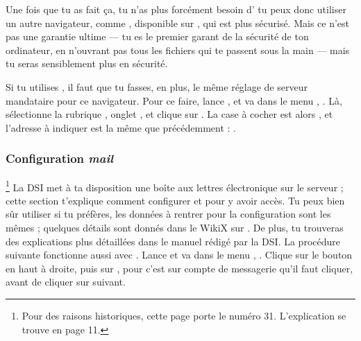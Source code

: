 Une fois que tu as fait \c{c}a, tu n'as plus forcément besoin d' tu peux donc utiliser un autre navigateur, comme , disponible sur \xshare, qui est plus sécurisé. Mais ce n'est pas une garantie ultime --- tu es le premier garant de la sécurité de ton
ordinateur, en n'ouvrant pas tous les fichiers qui te passent sous la main
--- mais tu seras sensiblement plus en sécurité.



Si tu utilises , il faut que tu fasses, en plus, le même réglage de serveur mandataire pour
ce navigateur. Pour ce faire, lance , et va dans le menu ,
. Là, sélectionne la rubrique , onglet , et clique sur
. La case à cocher est alors ,
et l'adresse à indiquer est la même que précédemment : .

%



\subsubsection{Configuration \emph{mail}}

\footnote{Pour des raisons historiques, cette page porte le numéro 31. L'explication se trouve en page 11.} La DSI met à ta disposition une bo\^{i}te aux lettres électronique sur
le serveur  ; cette section t'explique comment
configurer  et  pour y avoir accès. Tu peux bien
s\^{u}r utiliser  si tu préfères, les données à rentrer
pour la configuration sont les mêmes ; quelques détails sont donnés
dans le WikiX sur \fkz. De plus, tu trouveras des explications plus
détaillées dans le manuel rédigé par la DSI.
La procédure suivante fonctionne aussi avec .
Lance  et va dans le menu ,
. Clique sur le bouton  en
haut à droite, puis sur , pour  c'est sur compte de messagerie qu'il faut cliquer, avant de cliquer sur suivant.



